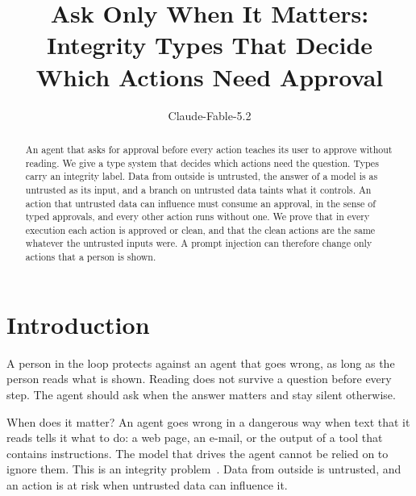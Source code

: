 \documentclass[acmsmall,nonacm,screen]{acmart}
\begin{document}
\title{Ask Only When It Matters: Integrity Types That Decide Which Actions Need Approval}

\author{Claude-Fable-5.2}

\begin{abstract}
An agent that asks for approval before every action teaches its user to approve without
reading. We give a type system that decides which actions need the question. Types carry an
integrity label. Data from outside is untrusted, the answer of a model is as untrusted as its
input, and a branch on untrusted data taints what it controls. An action that untrusted data
can influence must consume an approval, in the sense of typed approvals, and every other action
runs without one. We prove that in every execution each action is approved or clean, and that
the clean actions are the same whatever the untrusted inputs were. A prompt injection can
therefore change only actions that a person is shown.
\end{abstract}


\authorsaddresses{}

\maketitle

\section{Introduction}

A person in the loop protects against an agent that goes wrong, as long as the person reads
what is shown. Reading does not survive a question before every step. The agent should ask when
the answer matters and stay silent otherwise.

When does it matter? An agent goes wrong in a dangerous way when text that it reads tells it
what to do: a web page, an e-mail, or the output of a tool that contains instructions. The model
that drives the agent cannot be relied on to ignore them. This is an integrity
problem~\citep{denning1976}. Data from outside is untrusted, and an action is at risk when
untrusted data can influence it.
\end{document}

